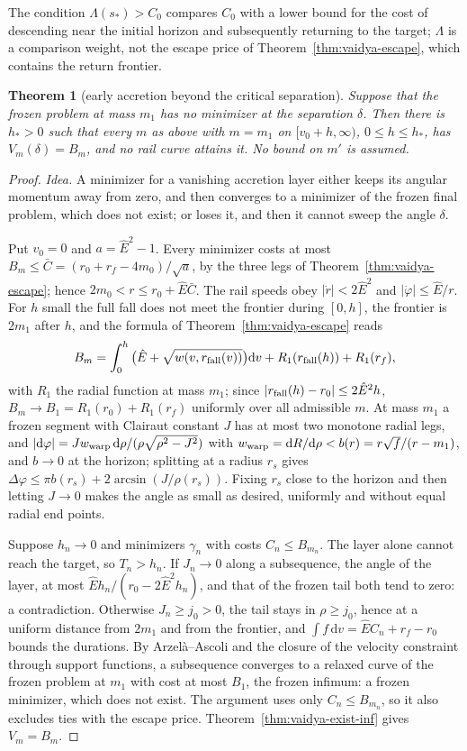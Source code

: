 \documentclass[aip,jmp,amsmath,amssymb,reprint]{revtex4-2}
\newcommand{\Ehat}{\hat E}
\newcommand{\dd}{\mathrm{d}}
\theoremstyle{plain}
\newtheorem{theorem}{Theorem}
\theoremstyle{definition}
\begin{document}
The condition $\Lambda(s_*)>C_0$ compares $C_0$ with a lower bound for the cost of descending near the
initial horizon and subsequently returning to the target; $\Lambda$ is a comparison weight, not the escape
price of Theorem~\ref{thm:vaidya-escape}, which contains the return frontier.

\begin{theorem}[early accretion beyond the critical separation]\label{thm:vaidya-early}
Suppose that the frozen problem at mass $m_1$ has no minimizer at the separation $\delta$. Then there is
$h_*>0$ such that every $m$ as above with $m=m_1$ on $[v_0+h,\infty)$, $0\le h\le h_*$, has $V_m(\delta)=B_m$, and no rail
curve attains it. No bound on $m'$ is assumed.
\end{theorem}

\begin{proof}
\emph{Idea.} A minimizer for a vanishing accretion layer either keeps its angular momentum away from zero,
and then converges to a minimizer of the frozen final problem, which does not exist; or loses it, and then
it cannot sweep the angle $\delta$.

Put $v_0=0$ and $a=\Ehat^2-1$. Every minimizer costs at most $B_m\le\bar C=(r_0+r_f-4m_0)/\sqrt a$, by the three
legs of Theorem~\ref{thm:vaidya-escape}; hence $2m_0<r\le r_0+\Ehat\bar C$. The rail speeds obey $|\dot r|<2\Ehat^2$
and $|\dot\varphi|\le\Ehat/r$. For $h$ small the full fall does not meet the frontier during $[0,h]$, the
frontier is $2m_1$ after $h$, and the formula of Theorem~\ref{thm:vaidya-escape} reads
\[
  B_m=\int_0^h\big(\Ehat+\sqrt{w(v,r_{\rm fall}(v))}\big)\dd v+R_1(r_{\rm fall}(h))+R_1(r_f),
\]
with $R_1$ the radial function at mass $m_1$; since $|r_{\rm fall}(h)-r_0|\le2\Ehat^2h$, $B_m\to B_1=R_1(r_0)+R_1(r_f)$
uniformly over all admissible $m$. At mass $m_1$ a frozen segment with Clairaut constant $J$ has at most two monotone radial legs, and
$|\dd\varphi|=Jw_{\rm warp}\,\dd\rho/(\rho\sqrt{\rho^2-J^2})$ with $w_{\rm warp}=\dd R/\dd\rho<b(r)=r\sqrt f/(r-m_1)$,
and $b\to0$ at the horizon; splitting at a radius $r_s$ gives $\Delta\varphi\le\pi b(r_s)+2\arcsin(J/\rho(r_s))$. Fixing $r_s$
close to the horizon and then letting $J\to0$ makes the angle as small as desired, uniformly and without
equal radial end points.

Suppose $h_n\to0$ and minimizers $\gamma_n$ with costs $C_n\le B_{m_n}$. The layer alone cannot reach the target,
so $T_n>h_n$. If $J_n\to0$ along a subsequence, the angle of the layer, at most $\Ehat h_n/(r_0-2\Ehat^2h_n)$, and
that of the frozen tail both tend to zero: a contradiction. Otherwise $J_n\ge j_0>0$, the tail stays in
$\rho\ge j_0$, hence at a uniform distance from $2m_1$ and from the frontier, and
$\int f\,\dd v=\Ehat C_n+r_f-r_0$ bounds the durations. By Arzel\`a--Ascoli and the closure of the
velocity constraint through support functions, a subsequence converges to a relaxed curve of the
frozen problem at $m_1$ with cost at most $B_1$, the frozen infimum: a frozen minimizer, which does not
exist. The argument uses only $C_n\le B_{m_n}$, so it also excludes ties with the escape price.
Theorem~\ref{thm:vaidya-exist-inf} gives $V_m=B_m$.
\end{proof}
\end{document}
